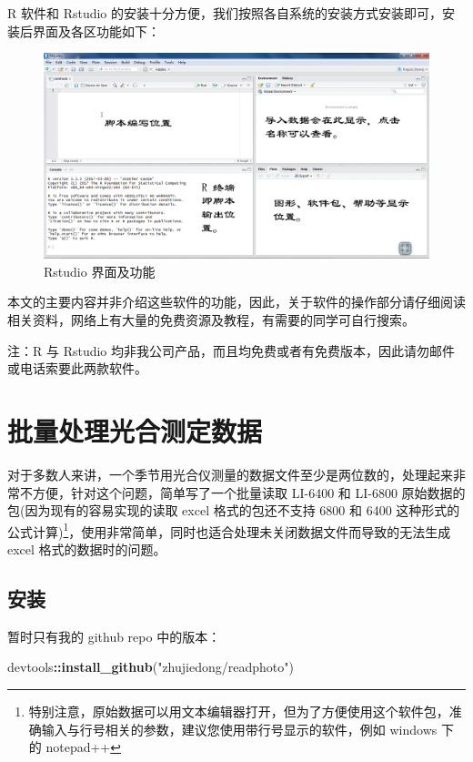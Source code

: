 \documentclass[]{krantz}
\makeatletter
\newenvironment{Shaded}{\begin{snugshade}}{\end{snugshade}}
\newcommand{\KeywordTok}[1]{\textcolor[rgb]{0.13,0.29,0.53}{\textbf{#1}}}
\newcommand{\StringTok}[1]{\textcolor[rgb]{0.31,0.60,0.02}{#1}}
\newcommand{\OperatorTok}[1]{\textcolor[rgb]{0.81,0.36,0.00}{\textbf{#1}}}
\newcommand{\NormalTok}[1]{#1}
\renewenvironment{quote}{\begin{VF}}{\end{VF}}
\newenvironment{kframe}{%
\medskip{}
\setlength{\fboxsep}{.8em}
 \def\at@end@of@kframe{}%
 \ifinner\ifhmode%
  \def\at@end@of@kframe{\end{minipage}}%
  \begin{minipage}{\columnwidth}%
 \fi\fi%
 \def\FrameCommand##1{\hskip\@totalleftmargin \hskip-\fboxsep
 \colorbox{shadecolor}{##1}\hskip-\fboxsep
     \hskip-\linewidth \hskip-\@totalleftmargin \hskip\columnwidth}%
 \MakeFramed {\advance\hsize-\width
   \@totalleftmargin\z@ \linewidth\hsize
   \@setminipage}}%
 {\par\unskip\endMakeFramed%
 \at@end@of@kframe}
\renewenvironment{Shaded}{\begin{kframe}}{\end{kframe}}
\theoremstyle{definition}
\theoremstyle{definition}
\theoremstyle{definition}
\theoremstyle{remark}
\makeatother
\begin{document}
R 软件和 Rstudio
的安装十分方便，我们按照各自系统的安装方式安装即可，安装后界面及各区功能如下：

\begin{figure}
\includegraphics[width=4.55in]{images/rstudio} \caption{Rstudio 界面及功能}\label{fig:unnamed-chunk-1}
\end{figure}

本文的主要内容并非介绍这些软件的功能，因此，关于软件的操作部分请仔细阅读相关资料，网络上有大量的免费资源及教程，有需要的同学可自行搜索。

\begin{quote}
注：R 与 Rstudio
均非我公司产品，而且均免费或者有免费版本，因此请勿邮件或电话索要此两款软件。
\end{quote}

\cleardoublepage

\chapter{批量处理光合测定数据}\label{batch_question}

对于多数人来讲，一个季节用光合仪测量的数据文件至少是两位数的，处理起来非常不方便，针对这个问题，简单写了一个批量读取
LI-6400 和 LI-6800 原始数据的包(因为现有的容易实现的读取 excel
格式的包还不支持 6800 和 6400 这种形式的公式计算)\footnote{特别注意，原始数据可以用文本编辑器打开，但为了方便使用这个软件包，准确输入与行号相关的参数，建议您使用带行号显示的软件，例如
  windows 下的 notepad++}，使用非常简单，同时也适合处理未关闭数据文件而导致的无法生成
excel 格式的数据时的问题。

\section{安装}\label{install_readphoto}

暂时只有我的 github repo 中的版本：

\begin{Shaded}
\begin{Highlighting}[]
\NormalTok{devtools}\OperatorTok{::}\KeywordTok{install_github}\NormalTok{(}\StringTok{"zhujiedong/readphoto"}\NormalTok{)}
\end{Highlighting}
\end{Shaded}
\end{document}
